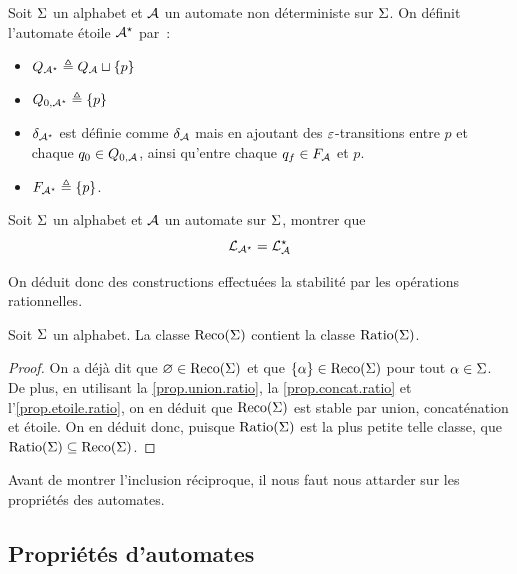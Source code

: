 \begin{definition}
  Soit $\Sigma$ un alphabet et $\mathcal{A}$ un automate non déterministe sur $\Sigma$.
  On définit l'automate étoile $\mathcal{A}^{\star}$ par~:
  \begin{itemize}
  \item $Q_{\mathcal{A}^{\star}} \triangleq Q_{\mathcal{A}} \sqcup \{p\}$
  \item $Q_{0,\mathcal{A}^{\star}} \triangleq \{p\}$
  \item $\delta_{\mathcal{A}^{\star}}$ est définie comme $\delta_{\mathcal{A}}$ mais en ajoutant des
    $\varepsilon$-transitions entre $p$ et chaque $q_{0}\in Q_{0,\mathcal{A}}$, ainsi
    qu'entre chaque $q_{f} \in F_{\mathcal{A}}$ et $p$.
  \item $F_{\mathcal{A}^{\star}} \triangleq \{p\}$.
  \end{itemize}
\end{definition}

\begin{exercise}\label{prop.etoile.ratio}
  Soit $\Sigma$ un alphabet et $\mathcal{A}$ un automate sur $\Sigma$, montrer que
  \[\mathcal L_{\mathcal{A}^{\star}} = \mathcal L_{\mathcal{A}}^{\star}\]
\end{exercise}

\noindent
On déduit donc des constructions effectuées la stabilité par les opérations
rationnelles.

\begin{corollary}
  Soit $\Sigma$ un alphabet. La classe $\operatorname{Reco}(\Sigma)$ contient la classe
  $\operatorname{Ratio}(\Sigma)$.
\end{corollary}

\begin{proof}
  On a déjà dit que $\varnothing \in \operatorname{Reco}(\Sigma)$ et que $\{\alpha\}\in \operatorname{Reco}(\Sigma)$
  pour tout $\alpha \in \Sigma$. De plus, en utilisant la \cref{prop.union.ratio},
  la \cref{prop.concat.ratio} et l'\cref{prop.etoile.ratio}, on en déduit que
  $\operatorname{Reco}(\Sigma)$ est stable par union, concaténation et étoile. On en déduit
  donc, puisque $\operatorname{Ratio}(\Sigma)$ est la plus petite telle classe, que
  $\operatorname{Ratio}(\Sigma)\subseteq\operatorname{Reco}(\Sigma)$.
\end{proof}

Avant de montrer l'inclusion réciproque, il nous faut nous attarder sur les
propriétés des automates.

\subsection{Propriétés d'automates}

